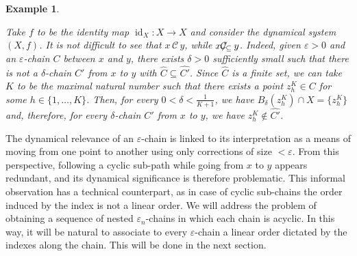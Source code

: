 \documentclass[10pt,a4paper]{article}
\theoremstyle{definition}
\theoremstyle{remark}
\theoremstyle{plain}
\newtheorem{example}{Example}
\begin{document}
\begin{example}
\begin{figure}[H]
    \end{figure}
    
    
    Take $f$ to be the identity map $\operatorname{id}_X:X\longrightarrow X$ and consider the dynamical system $(X,f)$. It is not difficult to see that $x\,\mathcal{C}\,y$, while $x\hspace{-.3em}\not\hspace{-0.3em}{\mathcal{C}_\subseteq}\,y$. Indeed, given $\varepsilon>0$ and an $\varepsilon$-chain $C$ between $x$ and $y$, there exists $\delta>0$ sufficiently small such that there is not a $\delta$-chain $C'$ from $x$ to $y$ with $\widehat{C}\subseteq\widehat{C'}$. Since $\widehat{C}$ is a finite set, we can take $K$ to be the maximal natural number such that there exists a point $z^K_h\in C$ for some $h\in\{1,\dots,K\}$. Then, for every $0<\delta<\frac{1}{K+1}$, we have $B_\delta(z^K_h)\cap X=\{z^K_h\}$ and, therefore, for every $\delta$-chain $C'$ from $x$ to $y$, we have $z^K_h\notin\widehat{C'}$.
\end{example}


The dynamical relevance of an $\varepsilon$-chain is linked to its interpretation as a means of moving from one point to another using only corrections of size $<\varepsilon$. From this perspective, following a cyclic sub-path while going from $x$ to $y$ appears redundant, and its dynamical significance is therefore problematic. This informal observation has a technical counterpart, as in case of cyclic sub-chains the order induced by the index is not a linear order.
We will address the problem of obtaining a sequence of nested $\varepsilon_n$-chains in which each chain is acyclic. In this way, it will be natural to associate to every $\varepsilon$-chain a linear order dictated by the indexes along the chain. 
This will be done in the next section. 
\end{document}
